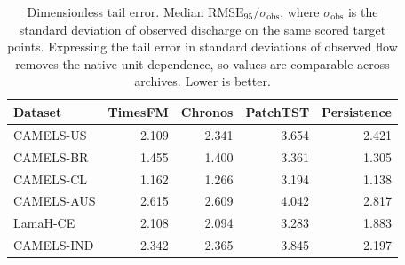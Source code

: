 \begin{table}[htbp]
\centering
\caption{Dimensionless tail error. Median $\mathrm{RMSE}_{95}/\sigma_{\mathrm{obs}}$, where $\sigma_{\mathrm{obs}}$ is the standard deviation of observed discharge on the same scored target points. Expressing the tail error in standard deviations of observed flow removes the native-unit dependence, so values are comparable across archives. Lower is better.}
\label{tab:tail_rmse_norm}
\begin{tabular}{lrrrr}
\hline
Dataset & TimesFM & Chronos & PatchTST & Persistence \\
\hline
CAMELS-US & 2.109 & 2.341 & 3.654 & 2.421 \\
CAMELS-BR & 1.455 & 1.400 & 3.361 & 1.305 \\
CAMELS-CL & 1.162 & 1.266 & 3.194 & 1.138 \\
CAMELS-AUS & 2.615 & 2.609 & 4.042 & 2.817 \\
LamaH-CE & 2.108 & 2.094 & 3.283 & 1.883 \\
CAMELS-IND & 2.342 & 2.365 & 3.845 & 2.197 \\
\hline
\end{tabular}
\end{table}
